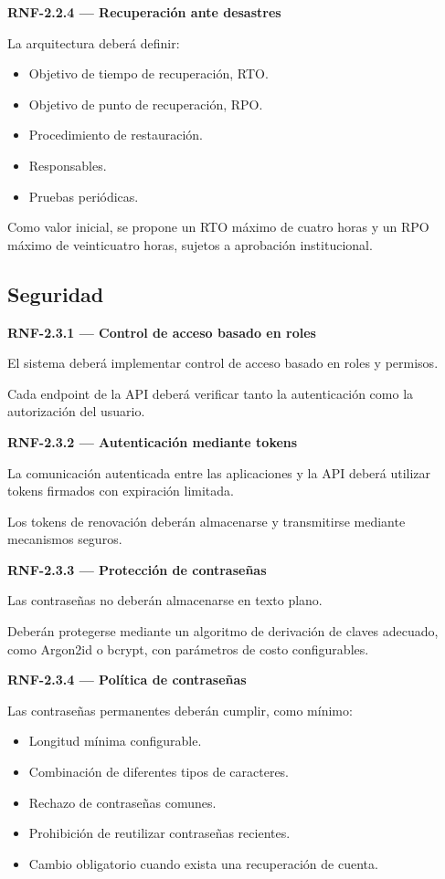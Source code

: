 \documentclass[12pt,a4paper]{article}
\newcommand{\RNF}[1]{\textbf{\color{secondary}RNF-#1}}
\newenvironment{requisito}[1]
{
\begin{center}
\begin{minipage}{0.96\textwidth}
\colorbox{requirement}{
\begin{minipage}{0.94\textwidth}
\textbf{#1}
\end{minipage}
}
\vspace{2mm}
}
{
\end{minipage}
\end{center}
}
\begin{document}
\begin{requisito}{\RNF{2.2.4} --- Recuperación ante desastres}
La arquitectura deberá definir:

\begin{itemize}[leftmargin=*]
\item Objetivo de tiempo de recuperación, RTO.
\item Objetivo de punto de recuperación, RPO.
\item Procedimiento de restauración.
\item Responsables.
\item Pruebas periódicas.
\end{itemize}

Como valor inicial, se propone un RTO máximo de cuatro horas y un RPO máximo de
veinticuatro horas, sujetos a aprobación institucional.
\end{requisito}

\subsection{Seguridad}

\begin{requisito}{\RNF{2.3.1} --- Control de acceso basado en roles}
El sistema deberá implementar control de acceso basado en roles y permisos.

Cada endpoint de la API deberá verificar tanto la autenticación como la
autorización del usuario.
\end{requisito}

\begin{requisito}{\RNF{2.3.2} --- Autenticación mediante tokens}
La comunicación autenticada entre las aplicaciones y la API deberá utilizar
tokens firmados con expiración limitada.

Los tokens de renovación deberán almacenarse y transmitirse mediante mecanismos
seguros.
\end{requisito}

\begin{requisito}{\RNF{2.3.3} --- Protección de contraseñas}
Las contraseñas no deberán almacenarse en texto plano.

Deberán protegerse mediante un algoritmo de derivación de claves adecuado, como
Argon2id o bcrypt, con parámetros de costo configurables.
\end{requisito}

\begin{requisito}{\RNF{2.3.4} --- Política de contraseñas}
Las contraseñas permanentes deberán cumplir, como mínimo:

\begin{itemize}[leftmargin=*]
\item Longitud mínima configurable.
\item Combinación de diferentes tipos de caracteres.
\item Rechazo de contraseñas comunes.
\item Prohibición de reutilizar contraseñas recientes.
\item Cambio obligatorio cuando exista una recuperación de cuenta.
\end{itemize}
\end{requisito}
\end{document}
